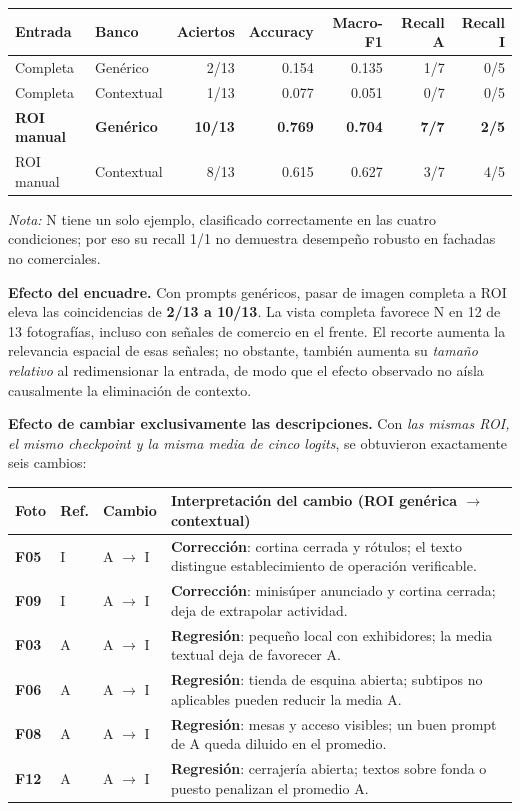 \documentclass[10pt,a4paper]{article}
\newcommand{\fcase}[1]{\textbf{F#1}}
\begin{document}
\begin{center}
\small
\begin{tabular}{@{}llrrrrr@{}}
\toprule
\textbf{Entrada} & \textbf{Banco} & \textbf{Aciertos} & \textbf{Accuracy} & \textbf{Macro-F1} & \textbf{Recall A} & \textbf{Recall I} \\
\midrule
Completa & Genérico & 2/13 & 0.154 & 0.135 & 1/7 & 0/5\\
Completa & Contextual & 1/13 & 0.077 & 0.051 & 0/7 & 0/5\\
\rowcolor{light} \textbf{ROI manual} & \textbf{Genérico} & \textbf{10/13} & \textbf{0.769} & \textbf{0.704} & \textbf{7/7} & \textbf{2/5}\\
ROI manual & Contextual & 8/13 & 0.615 & 0.627 & 3/7 & 4/5\\
\bottomrule
\end{tabular}
\end{center}
\emph{Nota:} N tiene un solo ejemplo, clasificado correctamente en las cuatro condiciones; por eso su recall 1/1 no demuestra desempeño robusto en fachadas no comerciales.

\textbf{Efecto del encuadre.} Con prompts genéricos, pasar de imagen completa a ROI eleva las coincidencias de \textbf{2/13 a 10/13}. La vista completa favorece N en 12 de 13 fotografías, incluso con señales de comercio en el frente. El recorte aumenta la relevancia espacial de esas señales; no obstante, también aumenta su \emph{tamaño relativo} al redimensionar la entrada, de modo que el efecto observado no aísla causalmente la eliminación de contexto.

\textbf{Efecto de cambiar exclusivamente las descripciones.} Con \emph{las mismas ROI, el mismo checkpoint y la misma media de cinco logits}, se obtuvieron exactamente seis cambios:
\begin{center}
\small
\begin{tabularx}{\linewidth}{@{}p{0.8cm}p{1.0cm}p{1.5cm}Y@{}}
\toprule
\textbf{Foto} & \textbf{Ref.} & \textbf{Cambio} & \textbf{Interpretación del cambio (ROI genérica $\to$ contextual)}\\
\midrule
\fcase{05} & I & A $\to$ I & \textbf{Corrección}: cortina cerrada y rótulos; el texto distingue establecimiento de operación verificable.\\
\fcase{09} & I & A $\to$ I & \textbf{Corrección}: minisúper anunciado y cortina cerrada; deja de extrapolar actividad.\\
\fcase{03} & A & A $\to$ I & \textbf{Regresión}: pequeño local con exhibidores; la media textual deja de favorecer A.\\
\fcase{06} & A & A $\to$ I & \textbf{Regresión}: tienda de esquina abierta; subtipos no aplicables pueden reducir la media A.\\
\fcase{08} & A & A $\to$ I & \textbf{Regresión}: mesas y acceso visibles; un buen prompt de A queda diluido en el promedio.\\
\fcase{12} & A & A $\to$ I & \textbf{Regresión}: cerrajería abierta; textos sobre fonda o puesto penalizan el promedio A.\\
\bottomrule
\end{tabularx}
\end{center}
\end{document}
